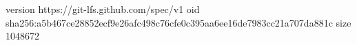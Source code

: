 version https://git-lfs.github.com/spec/v1
oid sha256:a5b467ce28852ecf9e26afc498c76cfe0c395aa6ee16de7983cc21a707da881c
size 1048672

